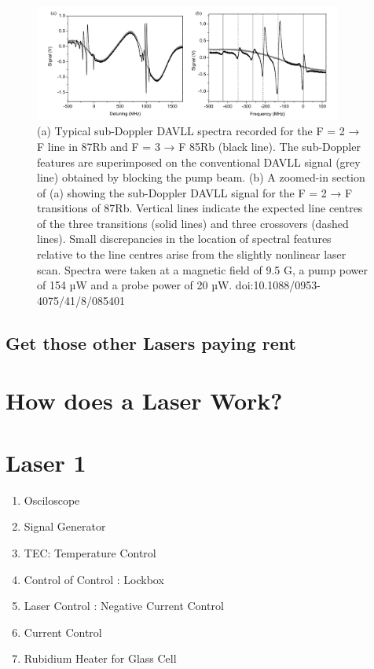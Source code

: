 \documentclass[10pt]{article}
\begin{document}
\begin{figure}[h]
    \centering
    \includegraphics[width=0.9\textwidth]{img/brrr.PNG}
    \caption{(a) Typical sub-Doppler DAVLL spectra recorded for the F = 2 → F line in 87Rb and F = 3 → F 85Rb (black line). The
    sub-Doppler features are superimposed on the conventional DAVLL signal (grey line) obtained by blocking the pump beam. (b) A
    zoomed-in section of (a) showing the sub-Doppler DAVLL signal for the F = 2 → F transitions of 87Rb. Vertical lines indicate the
    expected line centres of the three transitions (solid lines) and three crossovers (dashed lines). Small discrepancies in the location of spectral
    features relative to the line centres arise from the slightly nonlinear laser scan. Spectra were taken at a magnetic field of 9.5 G, a pump power of 154 µW and a probe power of 20 µW. doi:10.1088/0953-4075/41/8/085401}
    \label{fig:curvas}
\end{figure}





\subsection*{Get those other Lasers paying rent}

\newpage
\section*{How does a Laser Work? }
\section*{Laser 1}



\begin{enumerate}
    \item Osciloscope
    \item Signal Generator
    \item TEC: Temperature Control
    \item Control of Control : Lockbox
    \item Laser Control : Negative Current Control
    \item Current Control %
    \item Rubidium Heater for Glass Cell
\end{enumerate}
\end{document}
